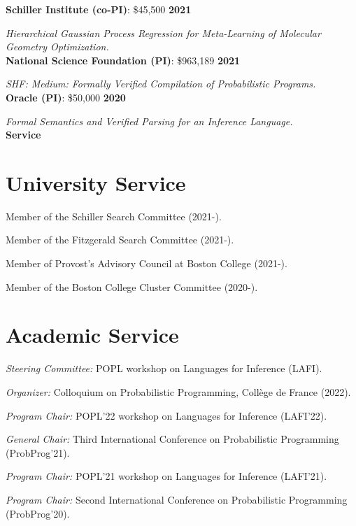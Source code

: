 \documentclass[margin,line]{res}
\begin{document}
\begin{resume}
{\bf Schiller Institute (co-PI)}: \$45,500 \hfill {\bf 2021}
\vspace{-.4cm}

{\em Hierarchical Gaussian Process Regression for Meta-Learning of Molecular Geometry Optimization.} \\

{\bf National Science Foundation (PI)}: \$963,189  \hfill {\bf 2021}
\vspace{-.4cm}

{\em SHF: Medium: Formally Verified Compilation of Probabilistic Programs.}\\

{\bf Oracle (PI)}: \$50,000 \hfill {\bf 2020}
\vspace{-.4cm}

{\em Formal Semantics and Verified Parsing for an Inference Language.} \\

\newpage
  {\bf {\Large Service}}

\section{\sc University Service}

Member of the Schiller Search Committee (2021-).

Member of the Fitzgerald Search Committee (2021-).

Member of Provost's Advisory Council at Boston College (2021-).

Member of the Boston College Cluster Committee (2020-).

\section{\sc Academic Service}

{\em Steering Committee:} POPL workshop on Languages for Inference (LAFI).

{\em Organizer:} Colloquium on Probabilistic Programming, Coll\`ege de France (2022).

{\em Program Chair:} POPL'22 workshop on Languages for Inference (LAFI'22).

{\em General Chair:} Third International Conference on Probabilistic Programming (ProbProg'21).

{\em Program Chair:} POPL'21 workshop on Languages for Inference (LAFI'21).

{\em Program Chair:} Second International Conference on Probabilistic Programming (ProbProg'20).


\end{resume}
\end{document}

